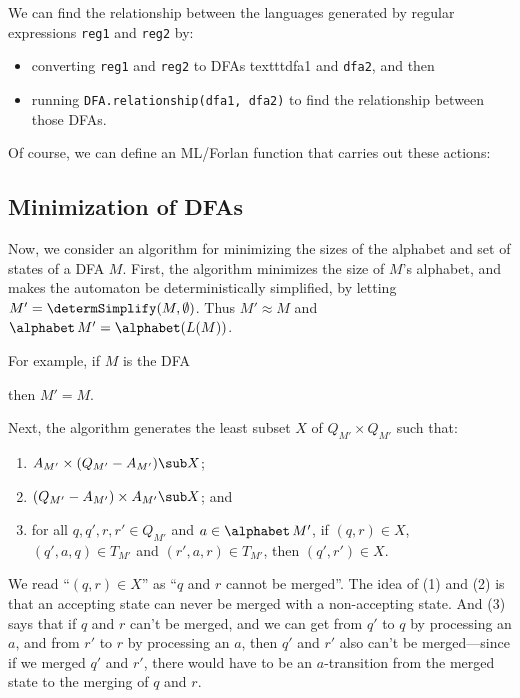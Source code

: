 We can find the relationship between the languages generated by regular
expressions \texttt{reg1} and \texttt{reg2} by:
\begin{itemize}
\item  converting \texttt{reg1} and \texttt{reg2} to DFAs
texttt{dfa1} and \texttt{dfa2}, and then

\item  running \texttt{DFA.relationship(dfa1, dfa2)} to find
the relationship between those DFAs.
\end{itemize}

Of course, we can define an ML/Forlan function that
carries out these actions:


\subsection{Minimization of DFAs}

Now, we consider an algorithm for minimizing the sizes of the alphabet
and set of states of a DFA $M$.  First, the algorithm minimizes the
size of $M$'s alphabet, and makes the automaton be deterministically
simplified, by letting $M'=\determSimplify(M,\emptyset)$.  Thus
$M'\approx M$ and $\alphabet\,M'=\alphabet(L(M))$.

For example, if $M$ is the DFA
\begin{center}

\end{center}
then $M'=M$.

Next, the algorithm generates the least subset $X$ of $Q_{M'}\times
Q_{M'}$ such that:
\begin{enumerate}[\quad(1)]
\item $A_{M'}\times(Q_{M'}-A_{M'})\sub X$;

\item $(Q_{M'}-A_{M'})\times A_{M'}\sub X$; and

\item for all $q,q',r,r'\in Q_{M'}$ and $a\in\alphabet\,M'$,
if $(q,r)\in X$, $(q',a, q)\in T_{M'}$ and $(r',a, r)\in T_{M'}$, then
$(q',r')\in X$.
\end{enumerate}
We read ``$(q,r)\in X$'' as ``$q$ and $r$ cannot be merged''.
The idea of (1) and (2) is that an accepting state can never be merged
with a non-accepting state.  And (3) says that if $q$ and $r$ can't
be merged, and we can get from $q'$ to $q$ by processing an $a$, and
from $r'$ to $r$ by processing an $a$, then
$q'$ and $r'$ also can't be merged---since if we merged $q'$ and $r'$,
there would have to be an $a$-transition from the merged state
to the merging of $q$ and $r$.

